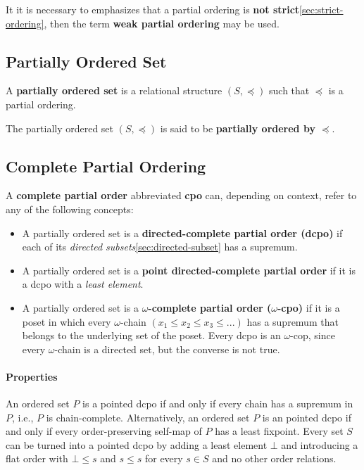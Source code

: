 It it is necessary to emphasizes that a partial ordering is
\textbf{not strict}\ref{sec:strict-ordering}, then the term
\textbf{weak partial ordering} may be used.


\subsection{Partially Ordered Set}
\label{sec:poset}

A \textbf{partially ordered set} is a relational structure
$(S, \preceq)$ such that $\preceq$ is a partial ordering.

The partially ordered set $(S, \preceq)$ is said to be
\textbf{partially ordered by $\preceq$}.



\subsection{Complete Partial Ordering}
\label{sec:cpo}

A \textbf{complete partial order} abbreviated \textbf{cpo} can,
depending on context, refer to any of the following concepts:

\begin{itemize}
\item A partially ordered set is a \textbf{directed-complete partial
    order (dcpo)} if each of its \textit{directed
    subsets}\ref{sec:directed-subset} has a supremum.
\item A partially ordered set is a \textbf{point directed-complete
    partial order} if it is a dcpo with a \textit{least element}.
\item A partially ordered set is a \textbf{$\omega$-complete partial
    order ($\omega$-cpo)} if it is a poset in which every
  $\omega$-chain $(x_1 \leq x_2 \leq x_3 \leq ...)$ has a supremum
  that belongs to the underlying set of the poset. Every dcpo is an
  $\omega$-cop, since every $\omega$-chain is a directed set, but the
  converse is not true.
\end{itemize}


\paragraph{Properties}

An ordered set $P$ is a pointed dcpo if and only if every chain has a
supremum in $P$, i.e., $P$ is chain-complete. Alternatively, an
ordered set $P$ is an pointed dcpo if and only if every
order-preserving self-map of $P$ has a least fixpoint. Every set $S$
can be turned into a pointed dcpo by adding a least element $\bot$ and
introducing a flat order with $\bot \leq s$ and $s \leq s$ for every
$s \in S$ and no other order relations.


